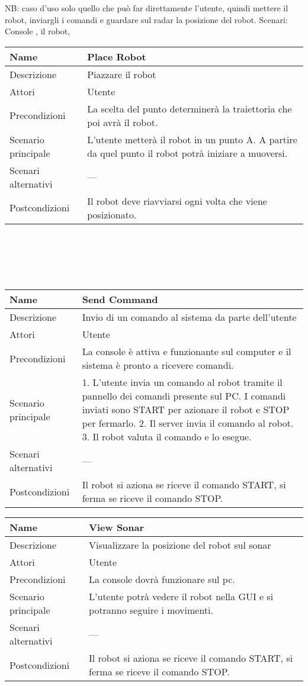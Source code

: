 \documentclass[a4paper]{article}
\begin{document}
NB: caso d’uso solo quello che può far direttamente l’utente, quindi mettere il robot, inviargli i comandi e guardare sul radar la posizione del robot. 
Scenari: Console , il robot,
\\
\begin{tabular}{ | m{5cm} | m{5cm}| }
\hline
	Name&Place Robot\\ 
\hline	
	Descrizione&Piazzare il robot\\
\hline	
	Attori&Utente\\
\hline	
	Precondizioni&La scelta del punto determinerà la traiettoria che poi avrà il robot.\\
\hline	
Scenario principale&L’utente metterà il robot in un punto A. A partire da quel punto il robot potrà iniziare a muoversi.\\
\hline	
Scenari alternativi&---\\
\hline	
Postcondizioni&Il robot deve riavviarsi ogni volta che viene posizionato.\\
\hline
\end{tabular}
\\
\\
\\
\\

\begin{tabular}{ | m{5cm} | m{5cm}| }
	\hline
	Name&Send Command\\ 
	\hline	
	Descrizione&Invio di un comando al sistema da parte dell’utente\\
	\hline	
	Attori&Utente\\
	\hline	
	Precondizioni&La console è attiva e funzionante sul computer e il sistema è pronto a ricevere comandi.\\
	\hline	
	Scenario principale&1. L’utente invia un comando al robot tramite il pannello dei comandi presente sul PC. I comandi inviati sono START per azionare il robot e STOP per fermarlo.
	2. Il server invia il comando al robot.
	3. Il robot valuta il comando e lo esegue.\\
	\hline	
	Scenari alternativi&---\\
	\hline	
	Postcondizioni&Il robot si aziona se riceve il comando START, si ferma se riceve il comando STOP.\\
	\hline
\end{tabular}


\begin{tabular}{ | m{5cm} | m{5cm}| }
	\hline
	Name&View Sonar\\ 
	\hline	
	Descrizione&Visualizzare la posizione del robot sul sonar\\
	\hline	
	Attori&Utente\\
	\hline	
	Precondizioni&La console dovrà funzionare sul pc.\\
	\hline	
	Scenario principale&L’utente potrà vedere il robot nella GUI e si potranno seguire i movimenti.\\
	\hline	
	Scenari alternativi&---\\
	\hline	
	Postcondizioni&Il robot si aziona se riceve il comando START, si ferma se riceve il comando STOP.\\
	\hline
\end{tabular}
\end{document}
